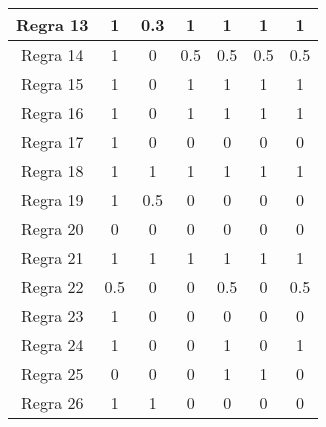 \begin{table}[h]
\begin{tabular}{|c|c|c|c|c|c|c|}
        Regra 13        & 1                & 0.3              & 1                 & 1                 & 1                & 1              \\ \hline
        Regra 14        & 1                & 0                & 0.5               & 0.5               & 0.5              & 0.5            \\ \hline
        Regra 15        & 1                & 0                & 1                 & 1                 & 1                & 1              \\ \hline
        Regra 16        & 1                & 0                & 1                 & 1                 & 1                & 1              \\ \hline
        Regra 17        & 1                & 0                & 0                 & 0                 & 0                & 0              \\ \hline
        Regra 18        & 1                & 1                & 1                 & 1                 & 1                & 1              \\ \hline
        Regra 19        & 1                & 0.5              & 0                 & 0                 & 0                & 0              \\ \hline
        Regra 20        & 0                & 0                & 0                 & 0                 & 0                & 0              \\ \hline
        Regra 21        & 1                & 1                & 1                 & 1                 & 1                & 1              \\ \hline
        Regra 22        & 0.5              & 0                & 0                 & 0.5               & 0                & 0.5            \\ \hline
        Regra 23        & 1                & 0                & 0                 & 0                 & 0                & 0              \\ \hline
        Regra 24        & 1                & 0                & 0                 & 1                 & 0                & 1              \\ \hline
        Regra 25        & 0                & 0                & 0                 & 1                 & 1                & 0              \\ \hline
        Regra 26        & 1                & 1                & 0                 & 0                 & 0                & 0              \\ \hline

\end{tabular}
\end{table}
